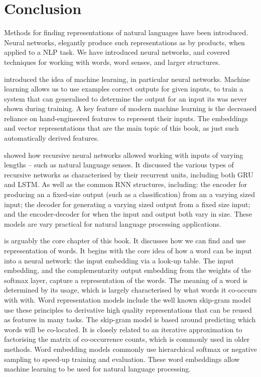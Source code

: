 \documentclass[12pt,parskip]{komatufte}
\begin{document}

\chapter{Conclusion}\label{sec:conclusion}

Methods for finding representations of natural languages have been introduced.
Neural networks, elegantly produce such representations as by products, when applied to a NLP task.
We have introduced neural networks, and covered techniques for working with words, word senses, and larger structures.



 introduced the idea of machine learning, in particular neural networks.
Machine learning allows us to use examples correct outputs for given inputs,
to train a system that can generalised to determine the output for an input its was never shown during training.
A key feature of modern machine learning is the decreased reliance on hand-engineered features to represent their inputs.
The embeddings and vector representations that are the main topic of this book, as just such automatically derived features.

 showed how recursive neural networks allowed working with inputs of varying lengths -- such as natural language senses.
It discussed the various types of recursive networks as characterised by their recurrent units, including both GRU and LSTM.
As well as the common RNN structures, including:
the encoder for producing an a fixed-size  output (such as a classification) from an a varying sized input;
the decoder for generating a varying sized output from a fixed size input;
and the encoder-decoder for when the input and output both vary in size.
These models are vary practical for natural language processing applications.

 is arguably the core chapter of this book.
It discusses how we can find and use representation of words.
It begins with the core idea of how a word can be input into a neural network:
the input embedding via a look-up table.
The input embedding, and the complementarity output embedding from the weights of the softmax layer, capture a representation of the words.
The meaning of a word is determined by its usage, which is largely characterised by what words it co-occurs with  with.
Word representation models include the well known skip-gram model use these principles to derivative high quality representations that can be reused as features in many tasks.
The skip-gram model is based around predicting which words will be co-located.
It is closely related to an iterative approximation to factorising the matrix of co-occurrence counts, which is commonly used in older methods.
Word embedding models commonly use  hierarchical softmax or negative sampling to speed-up training and evaluation.
These word embeddings allow machine learning to be used for natural language processing.
\end{document}

